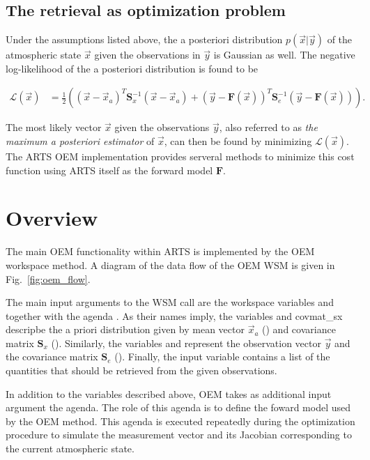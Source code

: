 \subsection{The retrieval as optimization problem}

Under the assumptions listed above, the a posteriori distribution $p(\vec{x} | \vec{y})$
of the atmospheric state $\vec{x}$ given the observations in $\vec{y}$
is Gaussian as well. The negative log-likelihood of the a posteriori distribution
is found to be

\begin{eqnarray}\label{eq:oem_cost}
 \mathcal{L}(\vec{x}) &= \frac{1}{2} \left (
	(\vec{x} - \vec{x}_a)^T \mathbf{S}^{-1}_x (\vec{x} - \vec{x}_a) +
        (\vec{y} - \mathbf{F}(\vec{x}))^T \mathbf{S}^{-1}_e (\vec{y} - \mathbf{F}(\vec{x}))
       	\right ).
\end{eqnarray}

The most likely vector $\vec{x}$ given the observations $\vec{y}$, also referred to
as \textit{the maximum a posteriori estimator} of $\vec{x}$, can then be
 found by minimizing $\mathcal{L}(\vec{x})$. The ARTS OEM implementation provides
serveral methods to minimize this cost function using ARTS itself as the forward model
$\mathbf{F}$.

\section{Overview}

The main OEM functionality within ARTS is implemented by the OEM workspace method.
A diagram of the data flow of the OEM WSM is given in Fig.~\ref{fig:oem_flow}.

The main input arguments to the WSM call are the workspace variables 
 and  together with the agenda
. As their names imply, the variables
  and {covmat\_sx} descripbe the a priori distribution given
by mean vector $\vec{x}_a$ () and covariance matrix $\mathbf{S}_x$
(). Similarly, the variables  and
 represent the observation vector $\vec{y}$ and the
 covariance matrix $\mathbf{S}_e$
(). Finally, the  input
 variable contains a list of the quantities that should be retrieved from the
given observations.

In addition to the variables described above, OEM takes as additional input argument
the  agenda. The role of this agenda is to define
the foward model used by the OEM method. This agenda is executed repeatedly during the
optimization procedure to simulate the measurement vector and its Jacobian corresponding to
the current atmospheric state.

